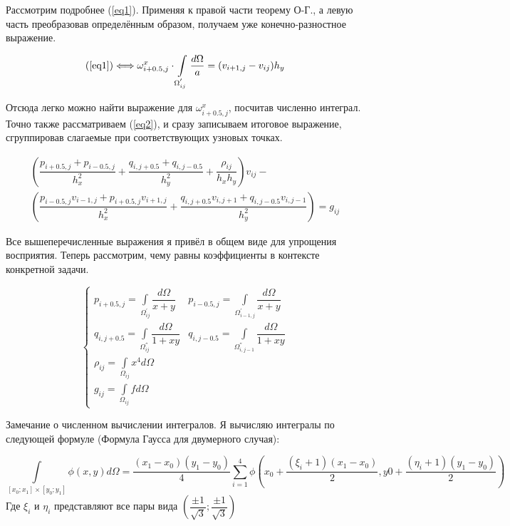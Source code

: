 \documentclass[12pt]{article}
\begin{document}
Рассмотрим подробнее (\ref{eq1}). Применяя к правой части теорему О-Г., а левую часть преобразовав определённым образом, получаем уже конечно-разностное выражение.

$$
(\ref{eq1}) \Longleftrightarrow \omega_{i+0.5,j}^x \cdot \int\limits_{\Omega_{ij}^{'}}{\dfrac{d\Omega}{a}} = (v_{i+1,j} - v_{ij})h_y
$$

Отсюда легко можно найти выражение для $\omega_{i+0.5,j}^x$, посчитав численно интеграл. Точно также рассматриваем (\ref{eq2}), и сразу записываем итоговое выражение, сгруппировав слагаемые при соответствующих узновых точках.

\begin{eqnarray}
\left( \dfrac{p_{i+0.5, j} + p_{i-0.5, j}}{h_x^2} + \dfrac{q_{i, j+0.5} + q_{i, j-0.5}}{h_y^2} + \dfrac{\rho_{ij}}{h_xh_y} \right) v_{ij} - \nonumber \\
\left( \dfrac{p_{i-0.5, j}v_{i-1,j} + p_{i+0.5, j}v_{i+1,j}}{h_x^2} + \dfrac{q_{i, j+0.5}v_{i,j+1} + q_{i, j-0.5}v_{i,j-1}}{h_y^2} \right) = g_{ij}
\end{eqnarray}

Все вышеперечисленные выражения я привёл в общем виде для упрощения восприятия. Теперь рассмотрим, чему равны коэффициенты в контексте конкретной задачи.

\begin{equation}
\begin{cases}
p_{i+0.5,j} = \int\limits_{\Omega_{ij}^{'}}{\dfrac{d\Omega}{x + y}} &
p_{i-0.5,j} = \int\limits_{\Omega_{i-1,j}^{'}}{\dfrac{d\Omega}{x + y}} \\
q_{i,j+0.5} = \int\limits_{\Omega_{ij}^{''}}{\dfrac{d\Omega}{1 + xy}} &
q_{i,j-0.5} = \int\limits_{\Omega_{i,j-1}^{''}}{\dfrac{d\Omega}{1 + xy}} \\
\rho_{ij} = \int\limits_{\Omega_{ij}}{x^4 d \Omega} \\
g_{ij} = \int\limits_{\Omega_{ij}}{fd \Omega} 
\end{cases}
\end{equation}

Замечание о численном вычислении интегралов. Я вычисляю интегралы по следующей формуле (Формула Гаусса для двумерного случая):

\begin{equation}
\int\limits_{[x_0; x_1] \times [y_0; y_1]}{\phi(x, y)d\Omega} = \dfrac{(x_1-x_0)(y_1-y_0)}{4} \sum\limits_{i=1}^4\phi\left(x_0 + \dfrac{(\xi_i+1)(x_1-x_0)}{2} ,y0 + \dfrac{(\eta_i+1)(y_1-y_0)}{2} \right)
\end{equation}
Где $\xi_i$ и $\eta_i$ представляют все пары вида $\left(\dfrac{\pm 1}{\sqrt{3}}; \dfrac{\pm 1}{\sqrt{3}}\right)$
 
\end{document}

